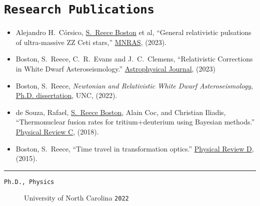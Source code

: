\documentclass[11pt, letter]{article}
\begin{document}
\section*{\tt Research Publications}
\begin{minipage}{\textwidth}
%
\begin{itemize}
		\item Alejandro H.~C\'orsico, \underline{S.~Reece Boston} et al, 
			``General relativistic pulsations of ultra-massive ZZ Ceti stars,'' 
			\href{https://doi.org/10.1093/mnras/stad2248}{MNRAS}, 
			(2023).
		\item Boston, S.~Reece, C.~R.~Evans and J.~C.~Clemens, 
			``Relativistic Corrections in White Dwarf Asteroseismology.'' 
			\href{https://iopscience.iop.org/article/10.3847/1538-4357/acd446}{Astrophysical Journal}, (2023)
		\item Boston, S.~Reece, 
			\emph{Newtonian and Relativistic White Dwarf Asteroseismology}, 
			\\\href{https://cdr.lib.unc.edu/concern/dissertations/jw827n44n?locale=en}{Ph.D. dissertation}, 
			UNC, (2022).
		\item de Souza, Rafael, \underline{S.~Reece Boston}, Alain Coc, and Christian Iliadis, 
			``Thermonuclear fusion rates for tritium+deuterium using Bayesian methods.''  
			\href{http://journals.aps.org/prc/abstract/10.1103/PhysRevC.99.014619}{Physical Review C}, 
			(2018).
		\item Boston, S.~Reece, 
			``Time travel in transformation optics.''  
			\href{http://journals.aps.org/prd/abstract/10.1103/PhysRevD.91.124035}{Physical Review D}, 
			(2015).
\end{itemize}
\hrule
\end{minipage}

\begin{description}
		\item[\tt Ph.D., Physics] University of North Carolina   \hfill {\tt 2022}
\end{description}
\vfill
\mbox{}
\end{document}
